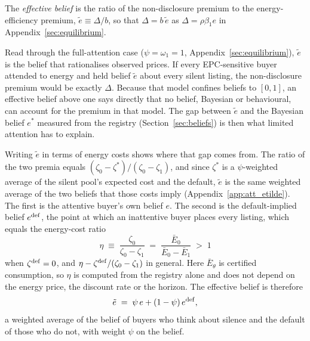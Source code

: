 \begin{definition}
\label{def:effective_belief}
The \emph{effective belief} is the ratio of the non-disclosure premium to the energy-efficiency premium, $\tilde e\equiv\Delta/b$, so that $\Delta=b\,\tilde e$ as $\Delta=\rho\beta_1 e$ in Appendix~\ref{sec:equilibrium}.
\end{definition}

Read through the full-attention case ($\psi=\omega_1=1$, Appendix~\ref{sec:equilibrium}), $\tilde e$ is the belief that rationalises observed prices. If every EPC-sensitive buyer attended to energy and held belief $\tilde e$ about every silent listing, the non-disclosure premium would be exactly $\Delta$. Because that model confines beliefs to $[0,1]$, an effective belief above one says directly that no belief, Bayesian or behavioural, can account for the premium in that model. The gap between $\tilde e$ and the Bayesian belief $e^*$ measured from the registry (Section~\ref{sec:beliefs}) is then what limited attention has to explain.

Writing $\tilde e$ in terms of energy costs shows where that gap comes from. The ratio of the two premia equals $(\zeta_0-\zeta^*)/(\zeta_0-\zeta_1)$, and since $\zeta^*$ is a $\psi$-weighted average of the silent pool's expected cost and the default, $\tilde e$ is the same weighted average of the two beliefs that those costs imply (Appendix~\ref{app:att_etilde}). The first is the attentive buyer's own belief $e$. The second is the default-implied belief $e^{\rm def}$, the point at which an inattentive buyer places every listing, which equals the energy-cost ratio
\begin{equation}
    \eta\;\equiv\;\frac{\zeta_0}{\zeta_0-\zeta_1}\;=\;\frac{\bar E_0}{\bar E_0-\bar E_1}\;>\;1
    \label{eq:eta}
\end{equation}
when $\zeta^{\rm def}=0$, and $\eta-\zeta^{\rm def}/(\zeta_0-\zeta_1)$ in general. Here $\bar E_\theta$ is certified consumption, so $\eta$ is computed from the registry alone and does not depend on the energy price, the discount rate or the horizon. The effective belief is therefore
\begin{equation}
    \tilde e\;=\;\psi\,e+(1-\psi)\,e^{\rm def},
    \label{eq:etilde}
\end{equation}
a weighted average of the belief of buyers who think about silence and the default of those who do not, with weight $\psi$ on the belief.

